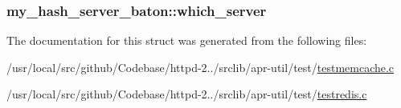 \subsubsection[{\texorpdfstring{which\+\_\+server}{which_server}}]{ my\+\_\+hash\+\_\+server\+\_\+baton\+::which\+\_\+server}\hypertarget{structmy__hash__server__baton_a3649258662914c7ddf0124a2a4e123de}{}\label{structmy__hash__server__baton_a3649258662914c7ddf0124a2a4e123de}


The documentation for this struct was generated from the following files\+:\begin{DoxyCompactItemize}
\item 
/usr/local/src/github/\+Codebase/httpd-\/2../srclib/apr-\/util/test/\hyperlink{testmemcache_8c}{testmemcache.\+c}\item 
/usr/local/src/github/\+Codebase/httpd-\/2../srclib/apr-\/util/test/\hyperlink{testredis_8c}{testredis.\+c}\end{DoxyCompactItemize}
